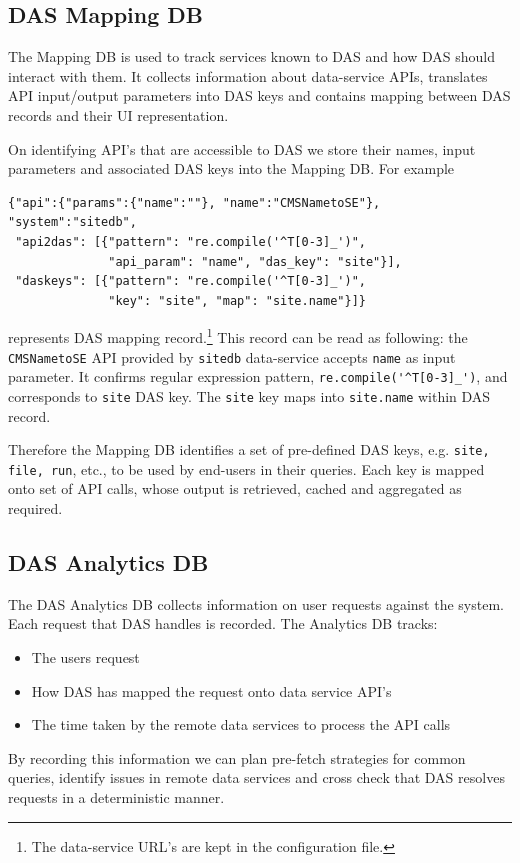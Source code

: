 \documentclass[1p,times]{elsarticle}
\begin{document}
\subsection{DAS Mapping DB\label{MappingDB}}
The Mapping DB is used to track services known to DAS and how DAS should interact with them.
It collects
information about data-service APIs, translates API input/output
parameters into DAS keys and contains mapping between DAS records
and their UI representation.

On identifying API's that are accessible to DAS we store
their names, input parameters and associated DAS keys
into the Mapping DB. For example
\begin{verbatim}
{"api":{"params":{"name":""}, "name":"CMSNametoSE"}, "system":"sitedb",
 "api2das": [{"pattern": "re.compile('^T[0-3]_')", 
              "api_param": "name", "das_key": "site"}], 
 "daskeys": [{"pattern": "re.compile('^T[0-3]_')", 
              "key": "site", "map": "site.name"}]}
\end{verbatim}
represents DAS mapping record.\footnote{
The data-service URL's are kept in the configuration file.
}
This record can be read as following:
the \verb+CMSNametoSE+ API provided by 
\verb+sitedb+ data-service accepts \verb+name+ as input parameter. It
confirms regular expression pattern, \verb+re.compile('^T[0-3]_')+, and
corresponds to \verb+site+ DAS key. The \verb+site+ key
maps into \verb+site.name+ within DAS record. 

Therefore the Mapping DB identifies a set of pre-defined DAS keys, 
e.g. \verb+site, file, run+, etc., to be used by end-users in their queries.
Each key is mapped onto set of API calls, whose output is retrieved,
cached and aggregated as required. 

\subsection{DAS Analytics DB}
The DAS Analytics DB collects information on user requests against the system.
Each request that DAS handles is recorded.
The Analytics DB tracks:
\begin{itemize}
\item The users request
\item How DAS has mapped the request onto data service API's
\item The time taken by the remote data services to process the API calls
\end{itemize}
By recording this information we can plan pre-fetch strategies for common queries,
identify issues in remote data services and cross check that DAS resolves requests
in a deterministic manner.
\end{document}
